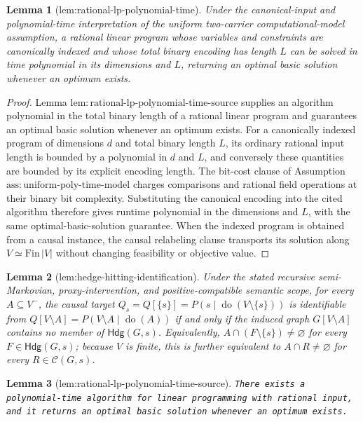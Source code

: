 \documentclass{article}
\newtheorem{lemma}{Lemma}
\begin{document}
\begin{lemma}[lem:rational-lp-polynomial-time]\label{lem:rational-lp-polynomial-time}
Under the canonical-input and polynomial-time interpretation of the uniform two-carrier computational-model assumption, a rational linear program whose variables and constraints are canonically indexed and whose total binary encoding has length \(L\) can be solved in time polynomial in its dimensions and \(L\), returning an optimal basic solution whenever an optimum exists.
\end{lemma}
\begin{proof}
Lemma
\(\mathrm{lem{:}rational\mbox{-}lp\mbox{-}polynomial\mbox{-}time\mbox{-}source}\)
supplies an algorithm polynomial in the total binary length of a rational
linear program and guarantees an optimal basic solution whenever an optimum
exists.  For a canonically indexed program of dimensions \(d\) and total
binary length \(L\), its ordinary rational input length is bounded by a
polynomial in \(d\) and \(L\), and conversely these quantities are bounded
by its explicit encoding length.  The bit-cost clause of Assumption
\(\mathrm{ass{:}uniform\mbox{-}poly\mbox{-}time\mbox{-}model}\) charges
comparisons and rational field operations at their binary bit complexity.
Substituting the canonical encoding into the cited algorithm therefore gives
runtime polynomial in the dimensions and \(L\), with the same
optimal-basic-solution guarantee.  When the indexed program is obtained from
a causal instance, the causal relabeling clause transports its solution
along \(V\simeq\mathrm{Fin}\,|V|\) without changing feasibility or objective
value.
\end{proof}

\begin{lemma}[lem:hedge-hitting-identification]\label{lem:hedge-hitting-identification}
Under the stated recursive semi-Markovian, proxy-intervention, and positive-compatible semantic scope, for every \(A\subseteq V^{-}\), the causal target \(Q_s=Q[\{s\}]=P(s\mid\operatorname{do}(V\setminus\{s\}))\) is identifiable from \(Q[V\setminus A]=P(V\setminus A\mid\operatorname{do}(A))\) if and only if the induced graph \(G[V\setminus A]\) contains no member of \(\mathsf{Hdg}(G,s)\). Equivalently, \(A\cap(F\setminus\{s\})\neq\varnothing\) for every \(F\in\mathsf{Hdg}(G,s)\); because \(V\) is finite, this is further equivalent to \(A\cap R\neq\varnothing\) for every \(R\in\mathcal C(G,s)\).
\end{lemma}

\begin{lemma}[lem:rational-lp-polynomial-time-source]\label{lem:rational-lp-polynomial-time-source}
\texttt{There exists a polynomial-\allowbreak{}time algorithm for linear programming with rational input,\allowbreak{} and it returns an optimal basic solution whenever an optimum exists.}
\end{lemma}
\end{document}
